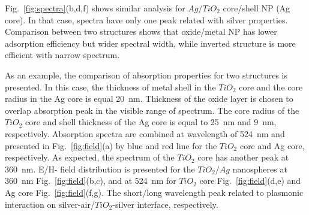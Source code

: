 \documentclass[aip,jap,reprint]{revtex4-1}
\begin{document}
Fig.~\ref{fig:spectra}(b,d,f) shows similar analysis for $Ag/TiO_2$
core/shell NP (Ag core). In that case, spectra have only one peak
related with silver properties.  Comparison between two structures
shows that oxide/metal NP has lower adsorption efficiency but wider
spectral width, while inverted structure is more efficient with narrow
spectrum.


As an example, the comparison of absorption properties for two
structures is presented. In this case, the thickness of metal shell in
the $TiO_2$ core and the core radius in the Ag core is equal 20~nm.
Thickness of the oxide layer is chosen to overlap absorption peak in
the visible range of spectrum. The core radius of the $TiO_2$ core and
shell thickness of the Ag core is equal to 25~nm and 9~nm,
respectively. Absorption spectra are combined at wavelength of 524~nm
and presented in Fig.~\ref{fig:field}(a) by blue and red line for the $TiO_2$ core and Ag
core, respectively.  As expected, the spectrum of the $TiO_2$ core has
another peak at 360~nm. E/H- field distribution is presented  for the
$TiO_2/Ag$ nanospheres at 360~nm Fig.~\ref{fig:field}(b,c), and at 524~nm for $TiO_2$ core
Fig.~\ref{fig:field}(d,e) and Ag core Fig.~\ref{fig:field}(f,g). The short/long wavelength peak
related to plasmonic interaction on silver-air/$TiO_2$-silver interface,
respectively.
\end{document}
